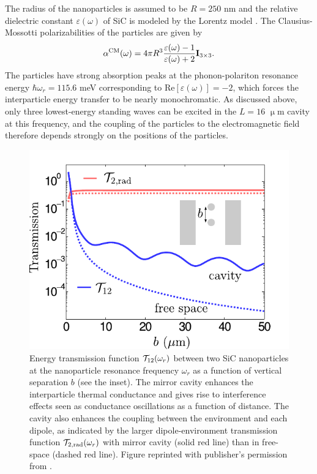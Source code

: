 The radius of the nanoparticles is assumed to be $R=250$ nm and the relative dielectric constant $\varepsilon(\omega)$ of SiC is modeled by the Lorentz model \cite{mulet01,spitzer59}. The Clausius-Mossotti polarizabilities of the particles are given by
\begin{equation}
 \alpha^{\textrm{CM}}(\omega)= 4 \pi R^3 \frac{\varepsilon(\omega)-1}{\varepsilon(\omega)+2} \mathbf{I}_{3 \times 3}.
\end{equation}
The particles have strong absorption peaks at the phonon-polariton resonance energy $\hbar \omega_r=115.6$ meV corresponding to $\textrm{Re}[\varepsilon(\omega)]=-2$, which forces the interparticle energy transfer to be nearly monochromatic. As discussed above, only three lowest-energy standing waves can be excited in the $L=16$ $\upmu$m cavity at this frequency, and the coupling of the particles to the electromagnetic field therefore depends strongly on the positions of the particles.  %

\begin{figure}
 \includegraphics[width=.79\columnwidth]{pics/dipole_fig5.pdf}
 \caption{Energy transmission function $\mathcal{T}_{12}(\omega_r)$ between two SiC nanoparticles at the nanoparticle resonance frequency $\omega_r$ as a function of vertical separation $b$ (see the inset). The mirror cavity enhances the interparticle thermal conductance and gives rise to interference effects seen as conductance oscillations as a function of distance. The cavity also enhances the coupling between the environment and each dipole, as indicated by the larger dipole-environment transmission function $\mathcal{T}_{2,\textrm{rad}}(\omega_r)$ with mirror cavity (solid red line) than in free-space (dashed red line). Figure reprinted with publisher's permission from .}
\label{fig:dipole_fig5}
\end{figure}

